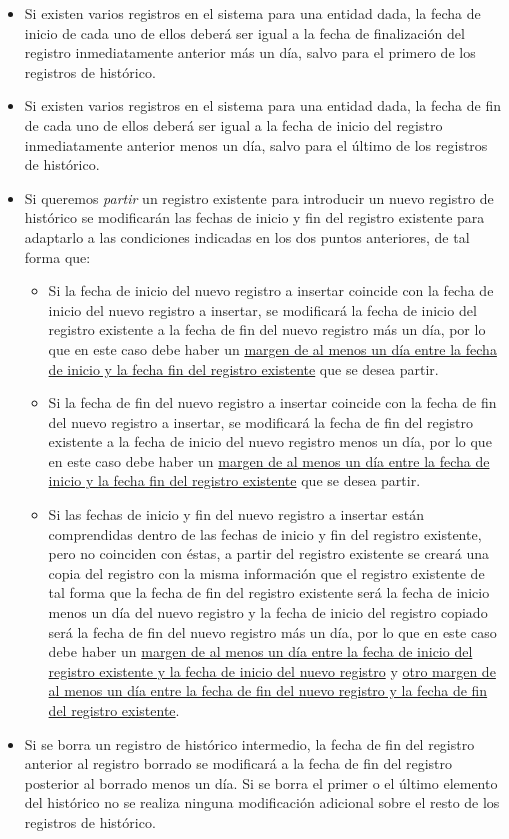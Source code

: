 \begin{itemize}
\item Si existen varios registros en el sistema para una entidad dada, la fecha de inicio de cada uno de ellos deberá ser igual a la fecha  de finalización del registro inmediatamente anterior más un día, salvo para el primero de los registros de histórico.
	\item Si existen varios registros en el sistema para una entidad dada, la fecha de fin de cada uno de ellos deberá ser igual a la fecha  de inicio del registro inmediatamente anterior menos un día, salvo para el último de los registros de histórico.
	\item Si queremos \textit{partir} un registro existente para introducir un nuevo registro de histórico se modificarán las fechas de inicio y fin del registro existente para adaptarlo a las condiciones indicadas en los dos puntos anteriores, de tal forma que:
	\begin{itemize}
		\item Si la fecha de inicio del nuevo registro a insertar coincide con la fecha de inicio del nuevo registro a insertar, se modificará la fecha de inicio del registro existente a la fecha de fin del nuevo registro más un día, por lo que en este caso debe haber un \underline{margen de al menos un día entre la fecha de inicio y la fecha fin del registro existente} que se desea partir. 
		\item Si la fecha de fin del nuevo registro a insertar coincide con la fecha de fin del nuevo registro a insertar, se modificará la fecha de fin del registro existente a la fecha de inicio del nuevo registro menos un día, por lo que en este caso debe haber un \underline{margen de al menos un día entre la fecha de inicio y la fecha fin del registro existente} que se desea partir. 
		\item Si las fechas de inicio y fin del nuevo registro a insertar están comprendidas dentro de las fechas de inicio y fin del registro existente, pero no coinciden con éstas, a partir del registro existente se creará una copia del registro con la misma información que el registro existente de tal forma que la fecha de fin del registro existente será la fecha de inicio menos un día del nuevo registro y la fecha de inicio del registro copiado será la fecha de fin del nuevo registro más un día, por lo que en este caso debe haber un \underline{margen de al menos un día entre la fecha de inicio del registro existente y la fecha de inicio del nuevo registro} y  \underline{otro margen de al menos un día entre la fecha de fin del nuevo registro y la fecha de fin del registro existente}.
	\end{itemize}
	\item Si se borra un registro de histórico intermedio, la fecha de fin del registro anterior al registro borrado se modificará a la fecha de fin del registro posterior al borrado menos un día. Si se borra el primer o el último elemento del histórico no se realiza ninguna modificación adicional sobre el resto de los registros de histórico.	
\end{itemize}


